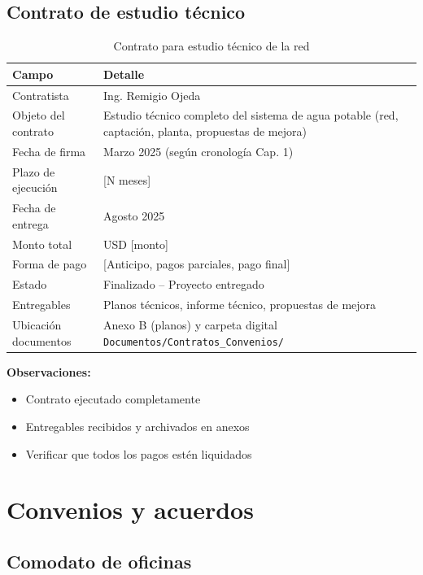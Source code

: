 \subsection*{Contrato de estudio técnico}

\begin{table}[H]
\centering
\caption{Contrato para estudio técnico de la red}
\label{tab:contrato-estudio}
\begin{tabularx}{\textwidth}{@{}lX@{}}
\toprule
\textbf{Campo} & \textbf{Detalle} \\
\midrule
Contratista & Ing. Remigio Ojeda \\
Objeto del contrato & Estudio técnico completo del sistema de agua potable (red, captación, planta, propuestas de mejora) \\
Fecha de firma & Marzo 2025 (según cronología Cap. 1) \\
Plazo de ejecución & [N meses] \\
Fecha de entrega & Agosto 2025 \\
Monto total & USD [monto] \\
Forma de pago & [Anticipo, pagos parciales, pago final] \\
Estado & Finalizado -- Proyecto entregado \\
Entregables & Planos técnicos, informe técnico, propuestas de mejora \\
Ubicación documentos & Anexo B (planos) y carpeta digital \texttt{Documentos/Contratos\_Convenios/} \\
\bottomrule
\end{tabularx}
\end{table}

\textbf{Observaciones:}
\begin{itemize}
  \item Contrato ejecutado completamente
  \item Entregables recibidos y archivados en anexos
  \item Verificar que todos los pagos estén liquidados
\end{itemize}

\section{Convenios y acuerdos}

\subsection*{Comodato de oficinas}

